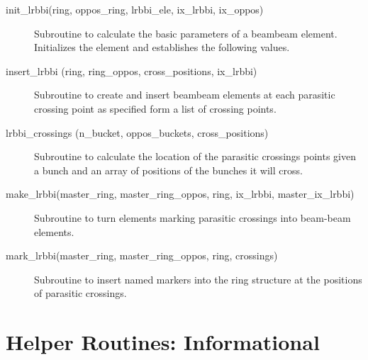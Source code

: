 \begin{description}

\item[init\_lrbbi(ring, oppos\_ring, lrbbi\_ele, ix\_lrbbi, ix\_oppos)] \Newline 
     Subroutine to calculate the basic parameters of a beambeam element. 
     Initializes the element and establishes the following values.

\item[insert\_lrbbi (ring, ring\_oppos, cross\_positions, ix\_lrbbi)] \Newline
Subroutine to create and insert beambeam elements at each parasitic crossing
point as specified form a list of crossing points.

\item[lrbbi\_crossings (n\_bucket, oppos\_buckets, cross\_positions)] \Newline
Subroutine to calculate the location of the parasitic crossings points 
given a bunch and an array of positions of the bunches it will cross. 

\item[make\_lrbbi(master\_ring, master\_ring\_oppos, ring, ix\_lrbbi, master\_ix\_lrbbi)] \Newline
Subroutine to turn elements marking parasitic crossings into beam-beam elements. 

\item[mark\_lrbbi(master\_ring, master\_ring\_oppos, ring, crossings)] \Newline
Subroutine to insert named markers into the ring structure at the positions of parasitic crossings. 

\end{description}

\section{Helper Routines: Informational}
\label{r:info}     

